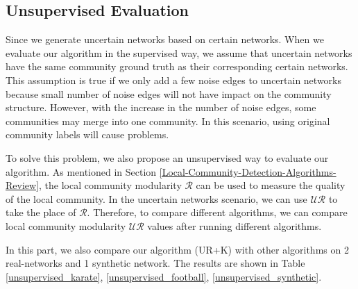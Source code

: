 \documentclass[\main/thesis.tex]{subfiles}
\begin{document}

\subsection*{Unsupervised Evaluation}
Since we generate uncertain networks based on certain networks. When we evaluate our algorithm in the supervised way, we assume that uncertain networks have the same community ground truth as their corresponding certain networks. This assumption is true if we only add a few noise edges to uncertain networks because small number of noise edges will not have impact on the community structure. However, with the increase in the number of noise edges, some communities may merge into one community. In this scenario, using original community labels will cause problems.

To solve this problem, we also propose an unsupervised way to evaluate our algorithm. As mentioned in Section \ref{Local-Community-Detection-Algorithms-Review}, the local community modularity $\mathcal{R}$ can be used to measure the quality of the local community. In the uncertain networks scenario, we can use $\mathcal{UR}$ to take the place of $\mathcal{R}$. Therefore, to compare different algorithms, we can compare local community modularity $\mathcal{UR}$ values after running different algorithms.

In this part, we also compare our algorithm (UR+K) with other algorithms on 2 real-networks and 1 synthetic network. The results are shown in Table \ref{unsupervised_karate}, \ref{unsupervised_football}, \ref{unsupervised_synthetic}.
\end{document}
